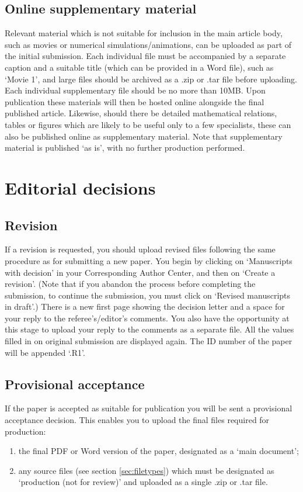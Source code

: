 \documentclass{jpp}
\begin{document}
\subsection{Online supplementary material}\label{online}
Relevant material which is not suitable for inclusion in the main article body, such as movies or numerical simulations/animations, can be uploaded as part of the initial submission. Each individual file must be accompanied by a separate caption and a suitable title (which can be provided in a Word file), such as `Movie 1', and large files should be archived as a .zip or .tar file before uploading. Each individual supplementary file should be no more than 10MB. Upon publication these materials will then be hosted online alongside the final published article. Likewise, should there be detailed mathematical relations, tables or figures which are likely to be useful only to a few specialists, these can also be published online as supplementary material. Note that supplementary material is published `as is', with no further production performed.

\section{Editorial decisions}

\subsection{Revision}
If a revision is requested, you should upload revised files following the same procedure as for submitting a new paper. You begin by clicking on `Manuscripts with decision' in your Corresponding Author Center, and then on `Create a revision'. (Note that if you abandon the process before completing the submission, to continue the submission, you must click on `Revised manuscripts in draft'.) There is a new first page showing the decision letter and a space for your reply to the referee's/editor's comments. You also have the opportunity at this stage to upload your reply to the comments as a separate file. All the values filled in on original submission are displayed again. The ID number of the paper will be appended `.R1'.

\subsection{Provisional acceptance}
If the paper is accepted as suitable for publication you will be sent a provisional acceptance decision. This enables you to upload the final files required for production:
\begin{enumerate}
\item the final PDF or Word version of the paper, designated as a `main document';
\item any source files (see section \ref{sec:filetypes}) which must be designated as `production (not for review)' and uploaded as a single .zip or .tar file.
\end{enumerate}
\end{document}
